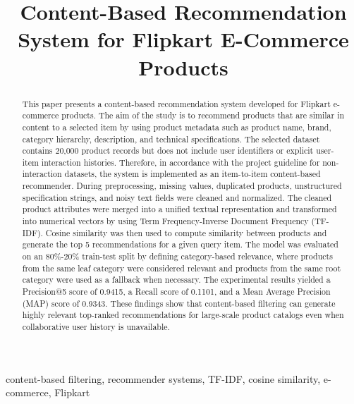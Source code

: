 \documentclass[conference]{IEEEtran}
\begin{document}
\title{Content-Based Recommendation System for Flipkart E-Commerce Products}

\author{
}

\maketitle

\begin{abstract}
This paper presents a content-based recommendation system developed for Flipkart e-commerce products. The aim of the study is to recommend products that are similar in content to a selected item by using product metadata such as product name, brand, category hierarchy, description, and technical specifications. The selected dataset contains 20,000 product records but does not include user identifiers or explicit user-item interaction histories. Therefore, in accordance with the project guideline for non-interaction datasets, the system is implemented as an item-to-item content-based recommender. During preprocessing, missing values, duplicated products, unstructured specification strings, and noisy text fields were cleaned and normalized. The cleaned product attributes were merged into a unified textual representation and transformed into numerical vectors by using Term Frequency-Inverse Document Frequency (TF-IDF). Cosine similarity was then used to compute similarity between products and generate the top 5 recommendations for a given query item. The model was evaluated on an 80\%-20\% train-test split by defining category-based relevance, where products from the same leaf category were considered relevant and products from the same root category were used as a fallback when necessary. The experimental results yielded a Precision@5 score of 0.9415, a Recall score of 0.1101, and a Mean Average Precision (MAP) score of 0.9343. These findings show that content-based filtering can generate highly relevant top-ranked recommendations for large-scale product catalogs even when collaborative user history is unavailable.
\end{abstract}

\begin{IEEEkeywords}
content-based filtering, recommender systems, TF-IDF, cosine similarity, e-commerce, Flipkart
\end{IEEEkeywords}
\end{document}
